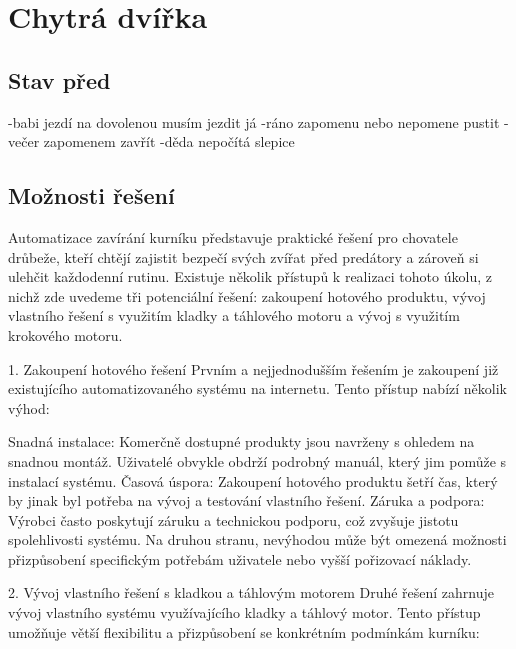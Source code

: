 \section{Chytrá dvířka}\label{sec:chytra-dvirka}
\subsection{Stav před}\label{subsec:chytra-dvirka-problemy}
-babi jezdí na dovolenou musím jezdit já\newline
-ráno zapomenu nebo nepomene pustit\newline
-večer zapomenem zavřít\newline
-děda nepočítá slepice\newline
\subsection{Možnosti řešení}\label{subsec:chytra-dvirka-moznosti-reseni}
Automatizace zavírání kurníku představuje praktické řešení pro chovatele drůbeže, kteří chtějí zajistit bezpečí svých zvířat před predátory a zároveň si ulehčit každodenní rutinu. Existuje několik přístupů k realizaci tohoto úkolu, z nichž zde uvedeme tři potenciální řešení: zakoupení hotového produktu, vývoj vlastního řešení s využitím kladky a táhlového motoru a vývoj s využitím krokového motoru.\newline

1. Zakoupení hotového řešení\newline
Prvním a nejjednodušším řešením je zakoupení již existujícího automatizovaného systému na internetu. Tento přístup nabízí několik výhod:

Snadná instalace: Komerčně dostupné produkty jsou navrženy s ohledem na snadnou montáž. Uživatelé obvykle obdrží podrobný manuál, který jim pomůže s instalací systému.
Časová úspora: Zakoupení hotového produktu šetří čas, který by jinak byl potřeba na vývoj a testování vlastního řešení.
Záruka a podpora: Výrobci často poskytují záruku a technickou podporu, což zvyšuje jistotu spolehlivosti systému.
Na druhou stranu, nevýhodou může být omezená možnosti přizpůsobení specifickým potřebám uživatele nebo vyšší pořizovací náklady.\newline

2. Vývoj vlastního řešení s kladkou a táhlovým motorem\newline
Druhé řešení zahrnuje vývoj vlastního systému využívajícího kladky a táhlový motor. Tento přístup umožňuje větší flexibilitu a přizpůsobení se konkrétním podmínkám kurníku:

